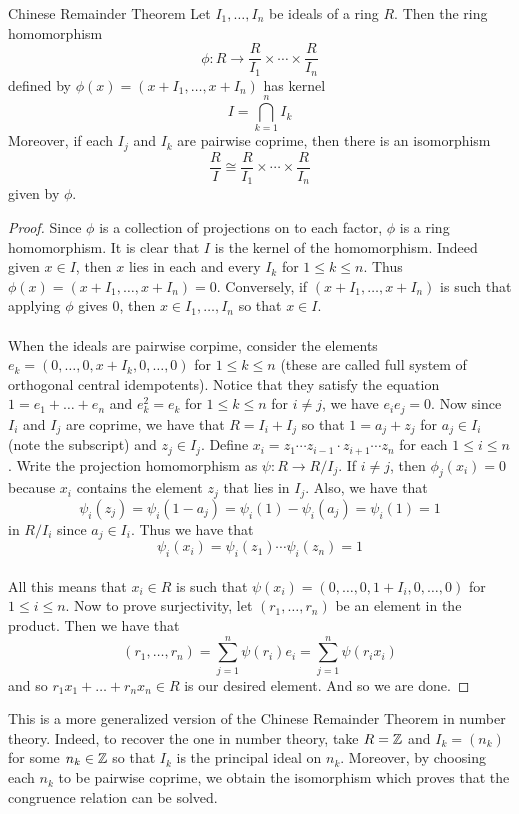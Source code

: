 \documentclass[a4paper]{article}
\begin{document}
\begin{thm}{Chinese Remainder Theorem}{} Let $I_1,\dots, I_n$ be ideals of a ring $R$. Then the ring homomorphism $$\phi:R\to\frac{R}{I_1}\times\cdots\times\frac{R}{I_n}$$ defined by $\phi(x)=(x+I_1,\dots,x+I_n)$ has kernel $$I=\bigcap_{k=1}^nI_k$$ Moreover, if each $I_j$ and $I_k$ are pairwise coprime, then there is an isomorphism $$\frac{R}{I}\cong\frac{R}{I_1}\times\cdots\times\frac{R}{I_n}$$ given by $\phi$. \tcbline
\begin{proof}
Since $\phi$ is a collection of projections on to each factor, $\phi$ is a ring homomorphism. It is clear that $I$ is the kernel of the homomorphism. Indeed given $x\in I$, then $x$ lies in each and every $I_k$ for $1\leq k\leq n$. Thus $\phi(x)=(x+I_1,\dots,x+I_n)=0$. Conversely, if $(x+I_1,\dots,x+I_n)$ is such that applying $\phi$ gives $0$, then $x\in I_1,\dots,I_n$ so that $x\in I$. \\~\\

When the ideals are pairwise corpime, consider the elements $e_k=(0,\dots,0,x+I_k,0,\dots,0)$ for $1\leq k\leq n$ (these are called full system of orthogonal central idempotents). Notice that they satisfy the equation $1=e_1+\dots+e_n$ and $e_k^2=e_k$ for $1\leq k\leq n$ for $i\neq j$, we have $e_ie_j=0$. Now since $I_i$ and $I_j$ are coprime, we have that $R=I_i+I_j$ so that $1=a_j+z_j$ for $a_j\in I_i$ (note the subscript) and $z_j\in I_j$. Define $x_i=z_1\cdots z_{i-1}\cdot z_{i+1}\cdots z_n$ for each $1\leq i\leq n$. Write the projection homomorphism as $\psi:R\to R/I_j$. If $i\neq j$, then $\phi_j(x_i)=0$ because $x_i$ contains the element $z_j$ that lies in $I_j$. Also, we have that $$\psi_i(z_j)=\psi_i(1-a_j)=\psi_i(1)-\psi_i(a_j)=\psi_i(1)=1$$ in $R/I_i$ since $a_j\in I_i$. Thus we have that $$\psi_i(x_i)=\psi_i(z_1)\cdots\psi_i(z_n)=1$$~\\

All this means that $x_i\in R$ is such that $\psi(x_i)=(0,\dots,0,1+I_i,0,\dots,0)$ for $1\leq i\leq n$. Now to prove surjectivity, let $(r_1,\dots,r_n)$ be an element in the product. Then we have that $$(r_1,\dots,r_n)=\sum_{j=1}^n\psi(r_i)e_i=\sum_{j=1}^n\psi(r_ix_i)$$ and so $r_1x_1+\dots+r_nx_n\in R$ is our desired element. And so we are done. 
\end{proof}
\end{thm}

This is a more generalized version of the Chinese Remainder Theorem in number theory. Indeed, to recover the one in number theory, take $R=\mathbb{Z}$ and $I_k=(n_k)$ for some $n_k\in\mathbb{Z}$ so that $I_k$ is the principal ideal on $n_k$. Moreover, by choosing each $n_k$ to be pairwise coprime, we obtain the isomorphism which proves that the congruence relation can be solved. \\~\\
\end{document}
